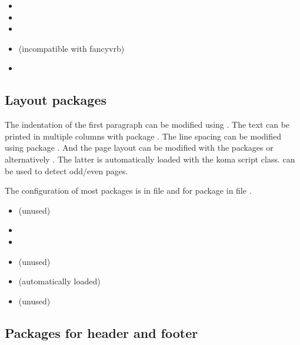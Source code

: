 \begin{itemize}[noitemsep]
\item {} 
\item {}
\item {}
\item {} (incompatible with fancyvrb)
\item {}
\end{itemize}


\subsection{Layout packages}
\label{sec:packages:layout}

The indentation of the first paragraph can be modified using . The text can be printed in multiple columns with package . The line spacing can be modified using package 
. And the page layout can be modified with the packages  or alternatively . The latter is automatically loaded with the koma script class.  can be used to detect odd/even pages.

The configuration of most packages is in file  and 
for package  in file .


\begin{itemize}[noitemsep]
\item {} (unused)
\item {}
\item {}
\item {} (unused)
\item {} (automatically loaded)
\item {} (unused)
\end{itemize}


\subsection{Packages for header and footer}
\label{sec:packages:headfoot}

